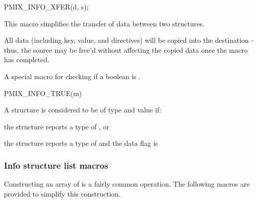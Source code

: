 \cspecificstart
\begin{codepar}
PMIX_INFO_XFER(d, s);
\end{codepar}
\cspecificend

\begin{arglist}
\end{arglist}

This macro simplifies the transfer of data between two structures.

\adviceuserstart
All data (including key, value, and directives) will be copied into the destination  - thus, the source  may be free'd without affecting the copied data once the macro has completed.
\adviceuserend



A special macro for checking if a boolean  is .

\cspecificstart
\begin{codepar}
PMIX_INFO_TRUE(m)
\end{codepar}
\cspecificend

\begin{arglist}
\end{arglist}

A  structure is considered to be of type  and value  if:

\begin{compactitemize}
    \item the structure reports a type of , or
    \item the structure reports a type of  and the data flag is 
\end{compactitemize}

\subsubsection{Info structure list macros}
Constructing an array of  is a fairly common operation. The following macros are provided to simplify this construction.


